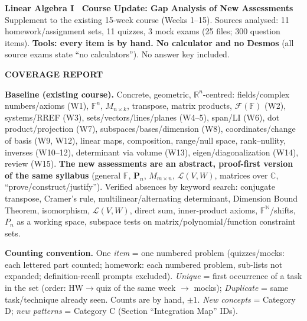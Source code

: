 \documentclass[9pt]{article}
\newcommand{\secn}[1]{\vspace{5pt}\par\noindent\begin{tcolorbox}[colback=NAVY,colframe=NAVY,boxrule=0pt,arc=2pt,left=5pt,top=1pt,bottom=1pt]\color{white}\bfseries\MakeUppercase{#1}\end{tcolorbox}\nopagebreak}
\begin{document}
\begin{tcolorbox}[colback=NAVY!5,colframe=NAVY,boxrule=0.7pt,arc=3pt]
{\Large\bfseries\color{NAVY}Linear Algebra I \textperiodcentered\ Course Update: Gap Analysis of New Assessments}\\
\small Supplement to the existing 15-week course (Weeks 1--15). Sources analysed: 11 homework/assignment sets, 11 quizzes, 3 mock exams (25 files; 300 question items). \textbf{Tools: every item is by hand. No calculator and no Desmos} (all source exams state ``no calculators''). No answer key included.
\end{tcolorbox}
\secn{Coverage Report}
\textbf{Baseline (existing course).} Concrete, geometric, $\mathbb R^n$-centred: fields/complex numbers/axioms (W1), $\mathbb F^n$, $M_{n\times k}$, transpose, matrix products, $\mathcal F(\mathbb F)$ (W2), systems/RREF (W3), sets/vectors/lines/planes (W4--5), span/LI (W6), dot product/projection (W7), subspaces/bases/dimension (W8), coordinates/change of basis (W9, W12), linear maps, composition, range/null space, rank--nullity, inverses (W10--12), determinant via volume (W13), eigen/diagonalization (W14), review (W15). \textbf{The new assessments are an abstract, proof-first version of the same syllabus} (general $\mathbb F$, $\mathbf P_n$, $M_{m\times n}$, $\mathcal L(V,W)$, matrices over $\mathbb C$, ``prove/construct/justify''). Verified absences by keyword search: conjugate transpose, Cramer's rule, multilinear/alternating determinant, Dimension Bound Theorem, isomorphism, $\mathcal L(V,W)$, direct sum, inner-product axioms, $\mathbb F^{\mathbb N}$/shifts, $P_n$ as a working space, subspace tests on matrix/polynomial/function constraint sets.

\textbf{Counting convention.} One \emph{item} = one numbered problem (quizzes/mocks: each lettered part counted; homework: each numbered problem, sub-lists not expanded; definition-recall prompts excluded). \emph{Unique} = first occurrence of a task in the set (order: HW$\to$quiz of the same week $\to$ mocks); \emph{Duplicate} = same task/technique already seen. Counts are by hand, $\pm1$. \emph{New concepts} = Category D; \emph{new patterns} = Category C (Section ``Integration Map'' IDs).
\end{document}
